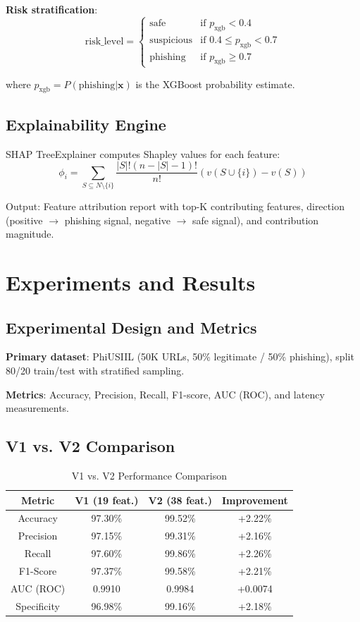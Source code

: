 \documentclass[conference]{IEEEtran}
\begin{document}
\textbf{Risk stratification}:
\[
\text{risk\_level} = \begin{cases}
\text{safe} & \text{if } p_{\text{xgb}} < 0.4 \\
\text{suspicious} & \text{if } 0.4 \leq p_{\text{xgb}} < 0.7 \\
\text{phishing} & \text{if } p_{\text{xgb}} \geq 0.7
\end{cases}
\]

where $p_{\text{xgb}} = P(\text{phishing} | \mathbf{x})$ is the XGBoost probability estimate.

\subsection{Explainability Engine}

SHAP TreeExplainer computes Shapley values for each feature:
\[
\phi_i = \sum_{S \subseteq N \setminus \{i\}} \frac{|S|!(n-|S|-1)!}{n!}(v(S \cup \{i\}) - v(S))
\]

Output: Feature attribution report with top-K contributing features, direction (positive $\to$ phishing signal, negative $\to$ safe signal), and contribution magnitude.

\section{Experiments and Results}

\subsection{Experimental Design and Metrics}

\textbf{Primary dataset}: PhiUSIIL (50K URLs, 50\% legitimate / 50\% phishing), split 80/20 train/test with stratified sampling.

\textbf{Metrics}: Accuracy, Precision, Recall, F1-score, AUC (ROC), and latency measurements.

\subsection{V1 vs. V2 Comparison}

\begin{table}[htbp]
\caption{V1 vs. V2 Performance Comparison}
\begin{center}
\begin{tabular}{|c|c|c|c|}
\hline
\textbf{Metric} & \textbf{V1 (19 feat.)} & \textbf{V2 (38 feat.)} & \textbf{Improvement} \\
\hline
Accuracy & 97.30\% & 99.52\% & +2.22\% \\
\hline
Precision & 97.15\% & 99.31\% & +2.16\% \\
\hline
Recall & 97.60\% & 99.86\% & +2.26\% \\
\hline
F1-Score & 97.37\% & 99.58\% & +2.21\% \\
\hline
AUC (ROC) & 0.9910 & 0.9984 & +0.0074 \\
\hline
Specificity & 96.98\% & 99.16\% & +2.18\% \\
\hline
\end{tabular}
\label{tab:v1v2}
\end{center}
\end{table}
\end{document}
